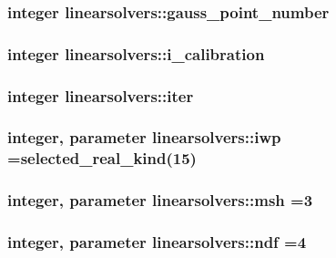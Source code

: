 \subsubsection[{gauss\+\_\+point\+\_\+number}]{\setlength{\rightskip}{0pt plus 5cm}integer linearsolvers\+::gauss\+\_\+point\+\_\+number}\label{classlinearsolvers_aa8d800b0797e3fcb1f1b356e1f50c72f}
\hypertarget{classlinearsolvers_ae3109655a0b2a3ce2f2f8055f36b42f5}{}
\subsubsection[{i\+\_\+calibration}]{\setlength{\rightskip}{0pt plus 5cm}integer linearsolvers\+::i\+\_\+calibration}\label{classlinearsolvers_ae3109655a0b2a3ce2f2f8055f36b42f5}
\hypertarget{classlinearsolvers_a17c8c1e427b50ea49bc6c44b1799c08f}{}
\subsubsection[{iter}]{\setlength{\rightskip}{0pt plus 5cm}integer linearsolvers\+::iter}\label{classlinearsolvers_a17c8c1e427b50ea49bc6c44b1799c08f}
\hypertarget{classlinearsolvers_ae428ee060e10bb0c2b1ce969c90536e1}{}
\subsubsection[{iwp}]{\setlength{\rightskip}{0pt plus 5cm}integer, parameter linearsolvers\+::iwp =selected\+\_\+real\+\_\+kind(15)}\label{classlinearsolvers_ae428ee060e10bb0c2b1ce969c90536e1}
\hypertarget{classlinearsolvers_a915e2590f13b0c2b952398e7f0d007e5}{}
\subsubsection[{msh}]{\setlength{\rightskip}{0pt plus 5cm}integer, parameter linearsolvers\+::msh =3}\label{classlinearsolvers_a915e2590f13b0c2b952398e7f0d007e5}
\hypertarget{classlinearsolvers_a16b2c5243d044cf63c37c79198897da4}{}
\subsubsection[{ndf}]{\setlength{\rightskip}{0pt plus 5cm}integer, parameter linearsolvers\+::ndf =4}\label{classlinearsolvers_a16b2c5243d044cf63c37c79198897da4}
\hypertarget{classlinearsolvers_a8ced5281550d7cc415867f4ffad677cc}{}
